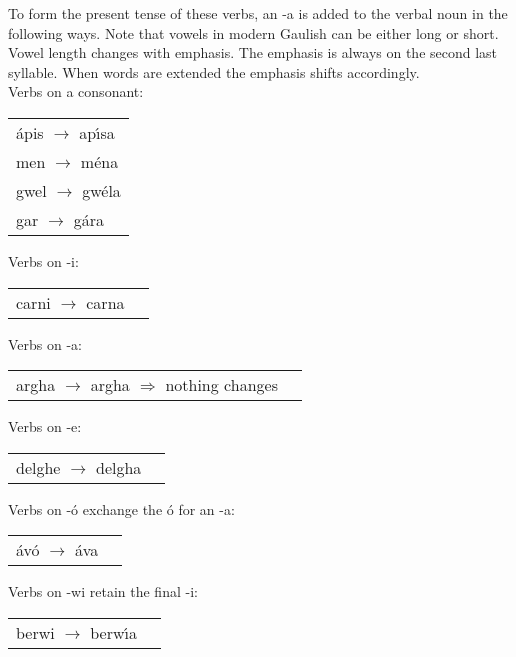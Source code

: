 To form the present tense of these verbs, an -a is added to the verbal noun in the following ways. Note that vowels in modern Gaulish can be either long or short. Vowel length changes with emphasis. The emphasis is always on the second last syllable. When words are extended the emphasis shifts accordingly.\\

Verbs on a consonant:
\begin{table}[H]
\begin{tabular}{l}
  \'{a}pis $\rightarrow$ ap\'{\i}sa\\
  men $\rightarrow$ m\'{e}na\\
  gwel $\rightarrow$ gw\'{e}la\\
  gar $\rightarrow$ g\'{a}ra\\
\end{tabular}
\label{examples_verbs_oac}
\end{table}

Verbs on -i:
\begin{table}[H]
\begin{tabular}{ll}
  carni $\rightarrow$ carna
\end{tabular}
\label{examples_verbs_on_i}
\end{table}

Verbs on -a:
\begin{table}[H]
\begin{tabular}{ll}
  argha $\rightarrow$ argha $\Rightarrow$ nothing changes
\end{tabular}
\label{examples_verbs_on_a}
\end{table}

Verbs on -e:
\begin{table}[H]
\begin{tabular}{ll}
  delghe $\rightarrow$ delgha
\end{tabular}
\label{examples_verbs_on_e}
\end{table}

Verbs on -\'{o} exchange the \'{o} for an -a:
\begin{table}[H]
\begin{tabular}{ll}
  \'{a}v\'{o} $\rightarrow$ \'{a}va
\end{tabular}
\label{examples_verbs_on_oo}
\end{table}

Verbs on -wi retain the final -i:
\begin{table}[H]
\begin{tabular}{ll}
  berwi $\rightarrow$ berw\'{\i}a
\end{tabular}
\label{examples_verbs_on_wi}
\end{table}

